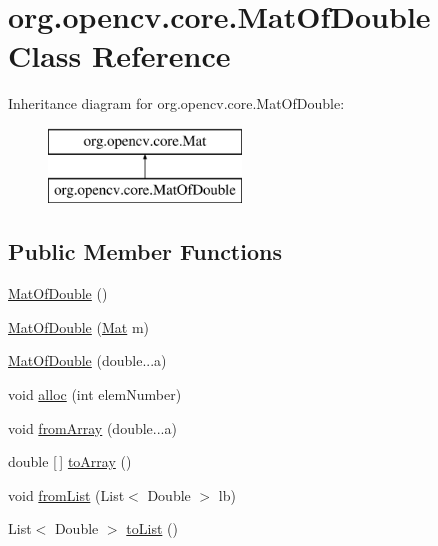 \hypertarget{classorg_1_1opencv_1_1core_1_1_mat_of_double}{}\section{org.\+opencv.\+core.\+Mat\+Of\+Double Class Reference}
\label{classorg_1_1opencv_1_1core_1_1_mat_of_double}
Inheritance diagram for org.\+opencv.\+core.\+Mat\+Of\+Double\+:\begin{figure}[H]
\begin{center}
\leavevmode
\includegraphics[height=2.000000cm]{classorg_1_1opencv_1_1core_1_1_mat_of_double}
\end{center}
\end{figure}
\subsection*{Public Member Functions}
\begin{DoxyCompactItemize}
\item 
\mbox{\hyperlink{classorg_1_1opencv_1_1core_1_1_mat_of_double_a46c61382d84cd3f0e7740f3bb8975e15}{Mat\+Of\+Double}} ()
\item 
\mbox{\hyperlink{classorg_1_1opencv_1_1core_1_1_mat_of_double_a4b3b794d48a2170a427d7c38b4160a91}{Mat\+Of\+Double}} (\mbox{\hyperlink{classorg_1_1opencv_1_1core_1_1_mat}{Mat}} m)
\item 
\mbox{\hyperlink{classorg_1_1opencv_1_1core_1_1_mat_of_double_a0500e17cba685dee9cac85f734d7d1d9}{Mat\+Of\+Double}} (double...\+a)
\item 
void \mbox{\hyperlink{classorg_1_1opencv_1_1core_1_1_mat_of_double_a9a450a16a2c31dded474649c526c93e7}{alloc}} (int elem\+Number)
\item 
void \mbox{\hyperlink{classorg_1_1opencv_1_1core_1_1_mat_of_double_a7ee84ad86b581a562243c1c6a394d281}{from\+Array}} (double...\+a)
\item 
double \mbox{[}$\,$\mbox{]} \mbox{\hyperlink{classorg_1_1opencv_1_1core_1_1_mat_of_double_ac943d8fa611a3fb3383c8e8a0a1ab242}{to\+Array}} ()
\item 
void \mbox{\hyperlink{classorg_1_1opencv_1_1core_1_1_mat_of_double_a3bd45ce863a90015bc8c7857f140003e}{from\+List}} (List$<$ Double $>$ lb)
\item 
List$<$ Double $>$ \mbox{\hyperlink{classorg_1_1opencv_1_1core_1_1_mat_of_double_abdc86f124bc68a1de1a30bf4f4b7f0db}{to\+List}} ()
\end{DoxyCompactItemize}
